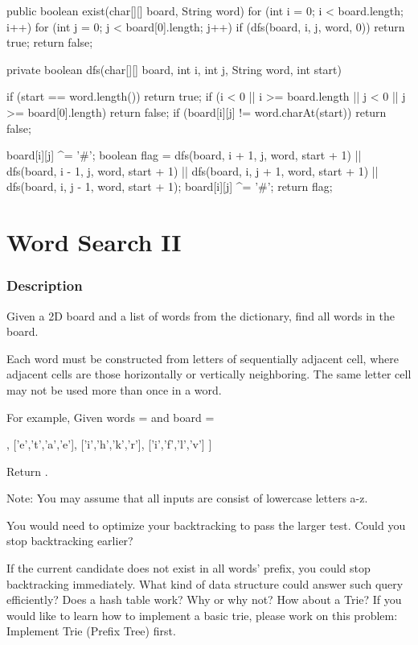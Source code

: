 \begin{Code}
public boolean exist(char[][] board, String word) {
    for (int i = 0; i < board.length; i++) {
        for (int j = 0; j < board[0].length; j++) {
            if (dfs(board, i, j, word, 0)) {
                return true;
            }
        }
    }
    return false;
}

private boolean dfs(char[][] board, int i, int j, String word, int start) {
    if (start == word.length()) {
        return true;
    }
    if (i < 0 || i >= board.length || j < 0 || j >= board[0].length) {
        return false;
    }
    if (board[i][j] != word.charAt(start)) {
        return false;
    }

    board[i][j] ^= '#';
    boolean flag = dfs(board, i + 1, j, word, start + 1)
            || dfs(board, i - 1, j, word, start + 1)
            || dfs(board, i, j + 1, word, start + 1)
            || dfs(board, i, j - 1, word, start + 1);
    board[i][j] ^= '#';
    return flag;
}
\end{Code}

\newpage

\section{Word Search II}

\subsubsection{Description}
Given a 2D board and a list of words from the dictionary, find all words in the board.

Each word must be constructed from letters of sequentially adjacent cell, where adjacent cells are those horizontally or vertically neighboring. The same letter cell may not be used more than once in a word.

For example,
Given words =  and board =
\begin{Code}
[
  ['o','a','a','n'],
  ['e','t','a','e'],
  ['i','h','k','r'],
  ['i','f','l','v']
]
\end{Code}
Return .

Note:
You may assume that all inputs are consist of lowercase letters a-z.

You would need to optimize your backtracking to pass the larger test. Could you stop backtracking earlier?

If the current candidate does not exist in all words' prefix, you could stop backtracking immediately. What kind of data structure could answer such query efficiently? Does a hash table work? Why or why not? How about a Trie? If you would like to learn how to implement a basic trie, please work on this problem: Implement Trie (Prefix Tree) first.

